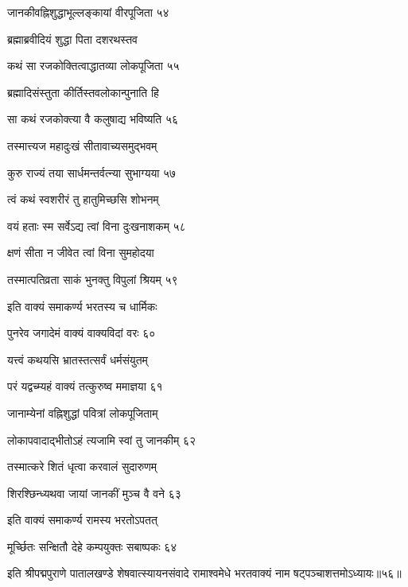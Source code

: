 जानकीवह्निशुद्धाभूल्लङ्कायां वीरपूजिता ५४

ब्रह्माब्रवीदियं शुद्धा पिता दशरथस्तव

कथं सा रजकोक्तित्वाद्धातव्या लोकपूजिता ५५

ब्रह्मादिसंस्तुता कीर्तिस्तवलोकान्पुनाति हि

सा कथं रजकोक्त्या वै कलुषाद्य भविष्यति ५६

तस्मात्त्यज महादुःखं सीतावाच्यसमुद्भवम्

कुरु राज्यं तया सार्धमन्तर्वत्न्या सुभाग्यया ५७

त्वं कथं स्वशरीरं तु हातुमिच्छसि शोभनम्

वयं हताः स्म सर्वेऽद्य त्वां विना दुःखनाशकम् ५८

क्षणं सीता न जीवेत त्वां विना सुमहोदया

तस्मात्पतिव्रता साकं भुनक्तु विपुलां श्रियम् ५९

इति वाक्यं समाकर्ण्य भरतस्य च धार्मिकः

पुनरेव जगादेमं वाक्यं वाक्यविदां वरः ६०

यत्त्वं कथयसि भ्रातस्तत्सर्वं धर्मसंयुतम्

परं यद्वच्म्यहं वाक्यं तत्कुरुष्व ममाज्ञया ६१

जानाम्येनां वह्निशुद्धां पवित्रां लोकपूजिताम्

लोकापवादाद्भीतोऽहं त्यजामि स्वां तु जानकीम् ६२

तस्मात्करे शितं धृत्वा करवालं सुदारुणम्

शिरश्छिन्ध्यथवा जायां जानकीं मुञ्च वै वने ६३

इति वाक्यं समाकर्ण्य रामस्य भरतोऽपतत्

मूर्च्छितः सन्क्षितौ देहे कम्पयुक्तः सबाष्पकः ६४

इति श्रीपद्मपुराणे पातालखण्डे शेषवात्स्यायनसंवादे रामाश्वमेधे भरतवाक्यं नाम षट्पञ्चाशत्तमोऽध्यायः॥५६॥


